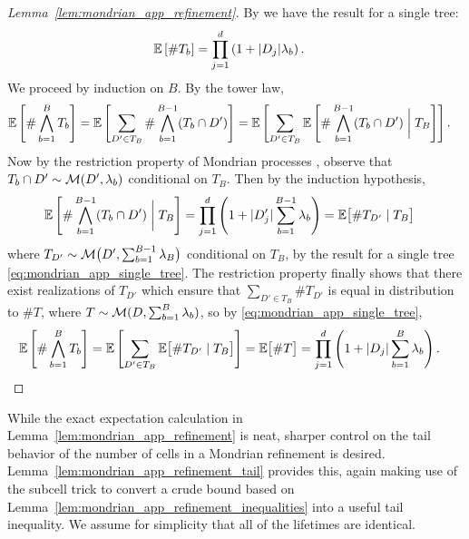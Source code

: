\begin{proof}[Lemma~\ref{lem:mondrian_app_refinement}]

  By \citet[Proposition~2]{mourtada2020minimax}
  we have the result for a single tree:
  \begin{align}
    \label{eq:mondrian_app_single_tree}
    \mathbb{E}\left[\# T_b \right]
    &= \prod_{j=1}^d \left(
      1 + |D_j| \lambda_b
    \right).
  \end{align}
  We proceed by induction on $B$.
  By the tower law,
  \begin{align*}
    \mathbb{E}\left[\# \bigwedge_{b=1}^B T_b \right]
    &=
    \mathbb{E}\left[
      \sum_{D' \in T_B}
      \#
      \bigwedge_{b=1}^{B-1} (T_b \cap D')
    \right]
    = \mathbb{E}\left[
      \sum_{D' \in T_B}
      \mathbb{E}\left[
        \#
        \bigwedge_{b=1}^{B-1} (T_b \cap D')
        \biggm| T_B
      \right]
    \right].
  \end{align*}
  Now by the restriction property of Mondrian processes
  \citep[Fact~2]{mourtada2020minimax},
  observe that $T_b \cap D' \sim \mathcal{M}(D', \lambda_b)$
  conditional on $T_B$.
  Then by the induction hypothesis,
  \begin{align*}
    \mathbb{E}\left[
      \#
      \bigwedge_{b=1}^{B-1} (T_b \cap D')
      \biggm| T_B
    \right]
    &=
    \prod_{j=1}^d \left(
      1 + |D'_j| \sum_{b=1}^{B-1} \lambda_b
    \right)
    = \mathbb{E}\big[
      \# T_{D'} \mid T_B
    \big]
  \end{align*}
  where $T_{D'} \sim \mathcal{M}\big(D', \sum_{b=1}^{B-1} \lambda_B\big)$
  conditional on $T_B$,
  by the result for a single tree \eqref{eq:mondrian_app_single_tree}.
  The restriction property finally shows that there exist realizations
  of $T_{D'}$ which ensure that
  $\sum_{D' \in T_B} \# T_{D'}$ is equal in distribution
  to $\# T$, where $T \sim \mathcal{M}(D, \sum_{b=1}^B \lambda_b)$,
  so by \eqref{eq:mondrian_app_single_tree},
  \begin{align*}
    \mathbb{E}\left[\# \bigwedge_{b=1}^B T_b \right]
    &=
    \mathbb{E}\left[
      \sum_{D' \in T_B}
      \mathbb{E}\big[
        \# T_{D'} \mid T_B
      \big]
    \right]
    =
    \mathbb{E}\big[\# T \big]
    = \prod_{j=1}^d \left(
      1 + |D_j| \sum_{b=1}^B \lambda_b
    \right).
  \end{align*}
\end{proof}

While the exact expectation calculation in
Lemma~\ref{lem:mondrian_app_refinement} is neat,
sharper control on the tail
behavior of the number of cells in a Mondrian refinement is desired.
Lemma~\ref{lem:mondrian_app_refinement_tail} provides this, again
making use of the subcell trick to convert a crude bound based on
Lemma~\ref{lem:mondrian_app_refinement_inequalities} into a useful tail
inequality.
We assume for simplicity that all of the lifetimes are identical.

